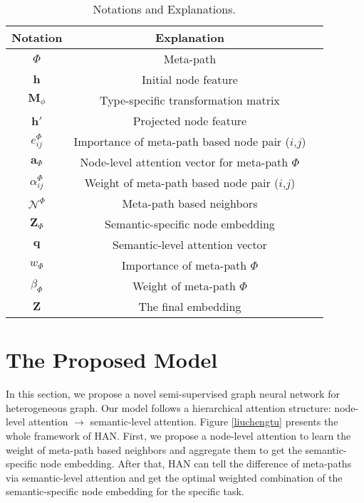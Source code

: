 \begin{table}
	\caption{Notations and Explanations.}
	\label{tab_notation}
	\begin{tabular}{ccl}
		\toprule
		Notation&Explanation\\
		\midrule
		


		${\Phi}$ & Meta-path \\
		${\mathbf{h}}$& Initial node feature \\
		$\mathbf{M}_{\phi}$ & Type-specific transformation matrix \\
		$\mathbf{h}' $& Projected node feature \\
		$e_{ij}^{\Phi}$ & Importance of meta-path based node pair ($i$,$j$) \\
		$\mathbf{a}_{\Phi}$ & Node-level attention vector for meta-path $\Phi$ \\
		$\alpha_{ij}^{\Phi}$ & Weight of 
		meta-path based node pair ($i$,$j$) \\
		
		$\mathcal{N}^{\Phi}$ & Meta-path based neighbors \\
		$\mathbf{Z}_{\Phi}$ & Semantic-specific node embedding \\
		$\mathbf{q}$ & Semantic-level attention vector \\
		
		$w_{\Phi}$ & Importance of meta-path $\Phi$ \\
		$\beta_{\Phi}$ & Weight of meta-path $\Phi$ \\
		$\mathbf{Z}$ & The final embedding \\
		\bottomrule
	\end{tabular}
\end{table}



\section{The Proposed Model}
In this section, we propose a novel semi-supervised graph neural network for heterogeneous graph.
Our model follows a hierarchical attention structure: node-level attention $\rightarrow$ semantic-level attention. Figure \ref{liuchengtu} presents the whole framework of HAN. 
First, we propose a node-level attention to learn the weight of meta-path based neighbors and aggregate them to get the semantic-specific node embedding.
After that, HAN can tell the difference of meta-paths via semantic-level attention and 
get the optimal weighted combination of  the semantic-specific node embedding for the specific task. 



